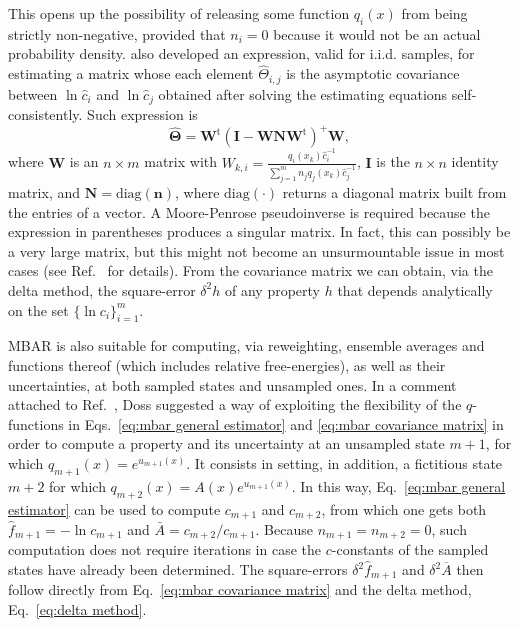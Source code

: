 \documentclass[journal=jctcce,manuscript=article,layout=twocolumn]{achemso}
\newcommand{\mt}[1]{\boldsymbol{\mathbf{#1}}}   %
\newcommand{\vt}[1]{\boldsymbol{\mathbf{#1}}}   %
\newcommand{\tr}[1]{#1^\text{t}}                %
\newcommand{\avg}[1]{\overline{#1}}             %
\begin{document}
This opens up the possibility of releasing some function $q_i(x)$ from being strictly non-negative, provided that $n_i = 0$ because it would not be an actual probability density. \citeauthor{Kong_2003} \cite{Kong_2003} also developed an expression, valid for i.i.d. samples, for estimating a matrix whose each element $\hat \Theta_{i,j}$ is the asymptotic covariance between $\ln \hat c_i$ and $\ln \hat c_j$ obtained after solving the estimating equations self-consistently. Such expression is
\begin{equation}
\label{eq:mbar covariance matrix}
\hat{\mt \Theta} = \tr{\mt W} (\mt I - {\mt W}{\mt N}\tr{\mt W})^+  {\mt W},
\end{equation}
where $\mt W$ is an $n \times m$ matrix with $W_{k,i} = \frac{q_i(x_k) \hat c_i^{-1}}{\sum_{j=1}^m n_j q_j(x_k) \hat c_j^{-1}}$, $\mt I$ is the $n \times n$ identity matrix, and $\mt N = \text{diag}(\vt n)$, where $\text{diag}(\cdot)$ returns a diagonal matrix built from the entries of a vector. A Moore-Penrose pseudoinverse is required because the expression in parentheses produces a singular matrix. In fact, this can possibly be a very large matrix, but this might not become an unsurmountable issue in most cases (see Ref.~ for details). From the covariance matrix we can obtain, via the delta method, the square-error $\delta^2 h$ of any property $h$ that depends analytically on the set $\{\ln c_i\}_{i=1}^m$.

MBAR is also suitable for computing, via reweighting, ensemble averages and functions thereof (which includes relative free-energies), as well as their uncertainties, at both sampled states and unsampled ones. In a comment attached to Ref.~, Doss suggested a way of exploiting the flexibility of the $q$-functions in Eqs.~\eqref{eq:mbar general estimator} and \eqref{eq:mbar covariance matrix} in order to compute a property and its uncertainty at an unsampled state $m+1$, for which $q_{m+1}(x) = e^{u_{m+1}(x)}$. It consists in setting, in addition, a fictitious state $m+2$ for which $q_{m+2}(x) = A(x)e^{u_{m+1}(x)}$. In this way, Eq.~\eqref{eq:mbar general estimator} can be used to compute $c_{m+1}$ and $c_{m+2}$, from which one gets both $\hat f_{m+1} = -\ln c_{m+1}$ and $\bar A = {c_{m+2}}/{c_{m+1}}$. Because $n_{m+1} = n_{m+2} = 0$, such computation does not require iterations in case the $c$-constants of the sampled states have already been determined. The square-errors $\delta^2 \hat f_{m+1}$ and $\delta^2 \avg A$ then follow directly from Eq.~\eqref{eq:mbar covariance matrix} and the delta method, Eq.~\eqref{eq:delta method}.


\end{document}
